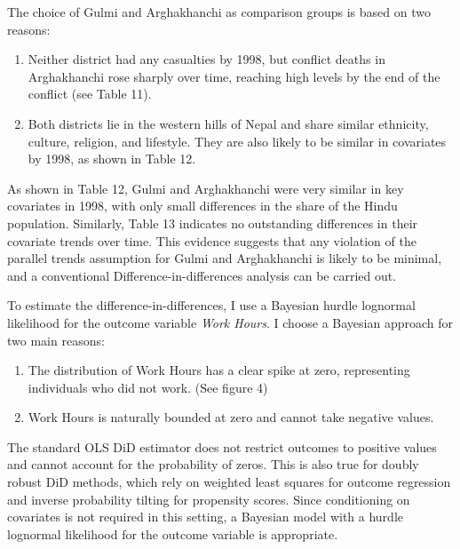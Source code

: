\documentclass[12pt,a4paper]{article}
\begin{document}
The choice of Gulmi and Arghakhanchi as comparison groups is based on two reasons:

\begin{enumerate}
	\item Neither district had any casualties by 1998, but conflict deaths in Arghakhanchi rose sharply over time, reaching high levels by the end of the conflict (see Table 11).
	
	\item Both districts lie in the western hills of Nepal and share similar ethnicity, culture, religion, and lifestyle. They are also likely to be similar in covariates by 1998, as shown in Table 12.
\end{enumerate}



As shown in Table 12, Gulmi and Arghakhanchi were very similar in key covariates in 1998, with only small differences in the share of the Hindu population. Similarly, Table 13 indicates no outstanding differences in their covariate trends over time. This evidence suggests that any violation of the parallel trends assumption for Gulmi and Arghakhanchi is likely to be minimal, and a conventional Difference-in-differences analysis can be carried out.



To estimate the difference-in-differences, I use a Bayesian hurdle lognormal likelihood for the outcome variable \textit{Work Hours}. I choose a Bayesian approach for two main reasons:

\begin{enumerate}
	\item The distribution of Work Hours has a clear spike at zero, representing individuals who did not work. (See figure 4)
	\item Work Hours is naturally bounded at zero and cannot take negative values.
\end{enumerate}

The standard OLS DiD estimator does not restrict outcomes to positive values and cannot account for the probability of zeros. This is also true for doubly robust DiD methods, which rely on weighted least squares for outcome regression and inverse probability tilting for propensity scores. Since conditioning on covariates is not required in this setting, a Bayesian model with a hurdle lognormal likelihood for the outcome variable is appropriate.
\end{document}
